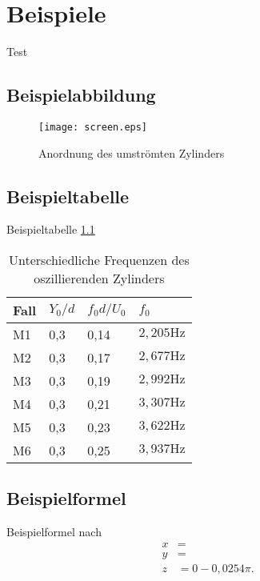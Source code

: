 \chapter{Beispiele}
Test

\section{Beispielabbildung}
\begin{figure}
	\centering
	\label{simaufbau}
	\texttt{[image: screen.eps]}
	\caption{Anordnung des umströmten Zylinders}
\end{figure}

\section{Beispieltabelle}
Beispieltabelle \ref{simaufbaufreqs}

\begin{table}[H]
	\caption{Unterschiedliche Frequenzen des oszillierenden Zylinders}
	\centering
	\begin{tabular}{l l l l}
		\hline
		Fall&$Y_0/d$&$f_0 d/U_0$& $f_0$\\ \hline
		M1 & 0,3 & 0,14& $2,205\text{Hz}$\\
		M2 & 0,3 & 0,17& $2,677\text{Hz}$\\
		M3 & 0,3 & 0,19& $2,992\text{Hz}$\\
		M4 & 0,3 & 0,21& $3,307\text{Hz}$\\
		M5 & 0,3 & 0,23& $3,622\text{Hz}$\\
		M6 & 0,3 & 0,25& $3,937\text{Hz}$\\ \hline
	\end{tabular}
\label{simaufbaufreqs}
\end{table}
\section{Beispielformel}
Beispielformel nach \cite{dong2005dns}
\begin{align}
x &= \\
y &= \\
z &= 0 - 0,0254 \pi.  
\end{align}
